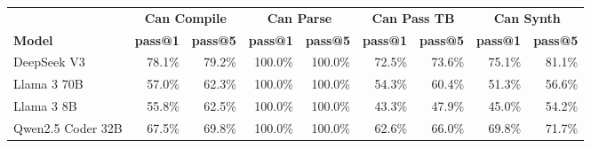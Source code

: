 \begin{tabular}{l|rr|rr|rr|rr}
\cmidrule[\heavyrulewidth]{2-9}
 & \multicolumn{2}{c|}{\textbf{Can Compile}} & \multicolumn{2}{c|}{\textbf{Can Parse}} & \multicolumn{2}{c|}{\textbf{Can Pass TB}} & \multicolumn{2}{c}{\textbf{Can Synth}} \\
\cmidrule(lr){2-3} \cmidrule(lr){4-5} \cmidrule(lr){6-7} \cmidrule(lr){8-9}
 \textbf{Model} & \textbf{pass@1} & \textbf{pass@5} & \textbf{pass@1} & \textbf{pass@5} & \textbf{pass@1} & \textbf{pass@5} & \textbf{pass@1} & \textbf{pass@5} \\
\midrule
DeepSeek V3 & 78.1\% & 79.2\% & 100.0\% & 100.0\% & 72.5\% & 73.6\% & 75.1\% & 81.1\% \\
Llama 3 70B & 57.0\% & 62.3\% & 100.0\% & 100.0\% & 54.3\% & 60.4\% & 51.3\% & 56.6\% \\
Llama 3 8B & 55.8\% & 62.5\% & 100.0\% & 100.0\% & 43.3\% & 47.9\% & 45.0\% & 54.2\% \\
Qwen2.5 Coder 32B & 67.5\% & 69.8\% & 100.0\% & 100.0\% & 62.6\% & 66.0\% & 69.8\% & 71.7\% \\
\bottomrule
\end{tabular}